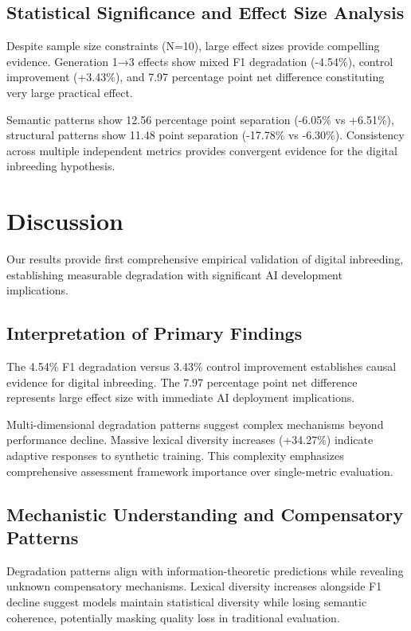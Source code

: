 \documentclass{article}
\begin{document}
\subsection{Statistical Significance and Effect Size Analysis}

Despite sample size constraints (N=10), large effect sizes provide compelling evidence. Generation 1→3 effects show mixed F1 degradation (-4.54\%), control improvement (+3.43\%), and 7.97 percentage point net difference constituting very large practical effect.

Semantic patterns show 12.56 percentage point separation (-6.05\% vs +6.51\%), structural patterns show 11.48 point separation (-17.78\% vs -6.30\%). Consistency across multiple independent metrics provides convergent evidence for the digital inbreeding hypothesis.

\section{Discussion}

Our results provide first comprehensive empirical validation of digital inbreeding, establishing measurable degradation with significant AI development implications.

\subsection{Interpretation of Primary Findings}

The 4.54\% F1 degradation versus 3.43\% control improvement establishes causal evidence for digital inbreeding. The 7.97 percentage point net difference represents large effect size with immediate AI deployment implications.

Multi-dimensional degradation patterns suggest complex mechanisms beyond performance decline. Massive lexical diversity increases (+34.27\%) indicate adaptive responses to synthetic training. This complexity emphasizes comprehensive assessment framework importance over single-metric evaluation.

\subsection{Mechanistic Understanding and Compensatory Patterns}

Degradation patterns align with information-theoretic predictions while revealing unknown compensatory mechanisms. Lexical diversity increases alongside F1 decline suggest models maintain statistical diversity while losing semantic coherence, potentially masking quality loss in traditional evaluation.
\end{document}
